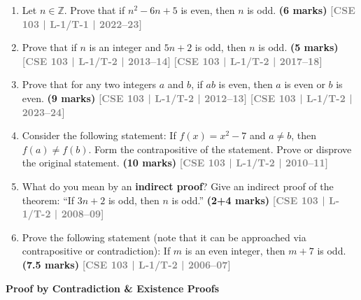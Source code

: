\documentclass[12pt,a3paper]{article}
\newcommand{\yr}[1]{\hfill\textcolor{gray}{\small\textbf{[#1]}}}
\newcommand{\mk}[1]{\textcolor{orange!70!black}{\small\textbf{(#1 marks)}}}
\newcommand{\subtopic}[2]{%
  \vspace{10pt}
  \noindent\begin{tcolorbox}[colback=#1!8,colframe=#1,boxrule=0.6pt,arc=4pt,
    left=6pt,right=6pt,top=4pt,bottom=4pt]
    \small\bfseries\textcolor{#1}{#2}
  \end{tcolorbox}
  \vspace{2pt}
}
\begin{document}
\begin{enumerate}

\item Let $n \in \mathbb{Z}$. Prove that if $n^2 - 6n + 5$ is even, then $n$ is odd.
\mk{6} \yr{CSE 103 | L-1/T-1 | 2022--23}

\item Prove that if $n$ is an integer and $5n + 2$ is odd, then $n$ is odd.
\mk{5} \yr{CSE 103 | L-1/T-2 | 2013--14} \yr{CSE 103 | L-1/T-2 | 2017--18}

\item Prove that for any two integers $a$ and $b$, if $ab$ is even, then $a$ is even or $b$ is even.
\mk{9} \yr{CSE 103 | L-1/T-2 | 2012--13} \yr{CSE 103 | L-1/T-2 | 2023--24}

\item Consider the following statement: If $f(x) = x^2 - 7$ and $a \neq b$, then $f(a) \neq f(b)$. Form the contrapositive of the statement. Prove or disprove the original statement.
\mk{10} \yr{CSE 103 | L-1/T-2 | 2010--11}

\item What do you mean by an \textbf{indirect proof}? Give an indirect proof of the theorem: ``If $3n + 2$ is odd, then $n$ is odd.''
\mk{2+4} \yr{CSE 103 | L-1/T-2 | 2008--09}

\item Prove the following statement (note that it can be approached via contrapositive or contradiction): If $m$ is an even integer, then $m + 7$ is odd.
\mk{7.5} \yr{CSE 103 | L-1/T-2 | 2006--07}

\end{enumerate}


\subtopic{cA}{Proof by Contradiction \& Existence Proofs}
\label{sub:s2-contradiction}
\end{document}
